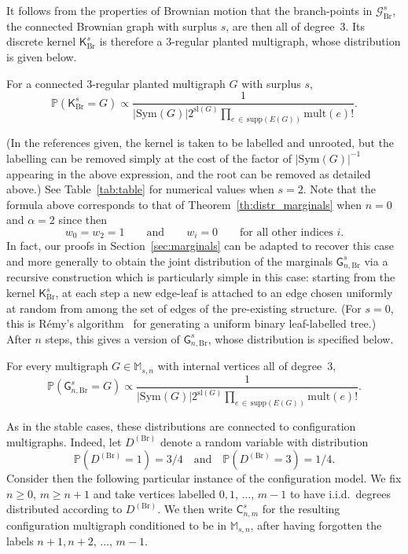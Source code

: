 \documentclass[AHL,Unicode,longabstracts,published]{cedram}
\newcommand{\abs}[1]{\left\lvert#1\right\rvert}
\newcommand{\Pp}[1]{\mathbb{P} \left(#1\right)}
\newcommand{\supp}{\mathrm{supp}}
\newcommand{\Br}{\mathrm{Br}}
\newcommand{\sll}{\mathrm{sl}}
\newcommand{\Sym}{\mathrm{Sym}}
\newcommand{\mult}{\mathrm{mult}}
\newcommand{\cG}{\mathcal{G}}
\newcommand{\sG}{\mathsf{G}}
\newcommand{\sK}{\mathsf{K}}
\newcommand{\sC}{\mathsf{C}}
\newcommand{\M}{\mathbb{M}}
\newcommand{\bbP}{\mathbb{P}}
\begin{document}
It follows from the properties of Brownian motion that the branch-points in $\cG_{\Br}^s$, the connected Brownian graph with surplus $s$, are then all of degree~3. Its discrete kernel $\sK_{\Br}^s$ is therefore a $3$-regular planted multigraph, whose distribution is given below.

\begin{theo}\label{th:distr_brow_ker}
For a connected $3$-regular planted multigraph $G$ with surplus $s$,
\[
\Pp{\sK_{\Br}^s=G}\propto\frac{1}{\abs{\Sym(G)}2^{\sll(G)}\prod\limits_{e\,\in\,\supp(E(G))}\mult(e)!}.
\]
\end{theo}

(In the references given, the kernel is taken to be labelled and unrooted, but the labelling can be removed simply at the cost of the factor of $|\Sym(G)|^{-1}$ appearing in the above expression, and the root can be removed as detailed above.) See Table~\ref{tab:table} for numerical values when $s=2$. Note that the formula above corresponds to that of Theorem~\ref{th:distr_marginals} when $n=0$ and $\alpha=2$ since then
\[
w_0=w_2=1 \qquad \text{and} \qquad w_i=0 \qquad \text{for all other indices } i.
\]
In fact, our proofs in Section~\ref{sec:marginals} can be adapted to recover this case and more generally to obtain the joint distribution of the marginals $\sG_{n,\Br}^s$ via a recursive construction which is particularly simple in this case: starting from the kernel $\sK_{\Br}^s$, at each step a new edge-leaf is attached to an edge chosen uniformly at random from among the set of edges of the pre-existing structure. (For $s=0$, this is Rémy's algorithm~\cite{Remy} for generating a uniform binary leaf-labelled tree.) After $n$ steps, this gives a version of $\sG_{n,\Br}^s$, whose distribution is specified below.

\begin{prop}\label{th:distr_brow_mar}
For every multigraph $G \in \M_{s,n}$ with internal vertices all of degree~3,
\[
\Pp{\sG_{n,{\Br}}^s=G}\propto\frac{1}{\abs{\Sym(G)}2^{\sll(G)}\prod\limits_{e\,\in\,\supp(E(G))}\mult(e)!}.
\]
\end{prop}

As in the stable cases, these distributions are connected to configuration multigraphs. Indeed, let $D^{(\Br)}$ denote a random variable with distribution
\[
\bbP\left(D^{({\Br})}=1\right)=3/4 \quad \text{and} \quad \bbP\left(D^{(\Br)}=3\right)=1/4.
\]
Consider then the following particular instance of the configuration model. We fix $n \ge 0$, $m \ge n+1$ and take vertices labelled $0, 1,\,\ldots,\,m-1$ to have i.i.d.\ degrees distributed according to $D^{(\Br)}$. We then write $\sC_{n,m}^s$ for the resulting configuration multigraph conditioned to be in $\M_{s,n}$, after having forgotten the labels $n+1, n+2,\,\ldots,\,m-1$.
\end{document}

